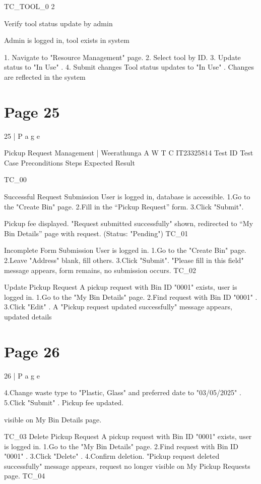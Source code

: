 \documentclass{article}
\begin{document}
TC\_TOOL\_0
2 
 
Verify tool 
status 
update by 
admin 
 
Admin is 
logged in, tool 
exists in 
system 
 
1. Navigate to 
"Resource 
Management" page. 
2. Select tool by ID. 
3. Update status to 
"In Use" . 4. Submit 
changes 
Tool status updates 
to "In Use" . 
Changes are 
reflected in the 
system 
 
 

\section*{Page 25}
25 | P a g e 
 
 
 
 
 
 
Pickup Request Management | Weerathunga A W T C 
IT23325814 
Test ID Test Case Preconditions Steps Expected 
Result 
     
TC\_00 
 
Successful 
Request 
Submission 
User is logged 
in, database is 
accessible. 
1.Go to the 
"Create Bin" 
page. 
2.Fill in the 
“Pickup 
Request” form. 
3.Click 
"Submit". 
 
Pickup fee 
displayed. 
"Request 
submitted 
successfully" 
shown, 
redirected to 
“My Bin 
Details” page 
with request. 
(Status: 
"Pending") 
TC\_01 
 
Incomplete 
Form 
Submission 
User is logged 
in. 
1.Go to the 
"Create Bin" 
page. 
2.Leave 
"Address" 
blank, fill 
others. 
3.Click 
"Submit". 
"Please fill in 
this field" 
message 
appears, form 
remains, no 
submission 
occurs. 
TC\_02 
 
Update Pickup 
Request 
A pickup 
request with 
Bin ID "0001" 
exists, user is 
logged in. 
1.Go to the "My 
Bin Details" 
page. 
2.Find request 
with Bin ID 
"0001" . 
3.Click "Edit" . 
A "Pickup 
request 
updated 
successfully" 
message 
appears, 
updated details 

\section*{Page 26}
26 | P a g e 
 
4.Change waste 
type to "Plastic, 
Glass" and 
preferred date 
to 
"03/05/2025" . 
5.Click 
"Submit" . 
Pickup fee 
updated. 
 
visible on My 
Bin Details 
page. 
 
TC\_03 Delete Pickup 
Request 
A pickup 
request with 
Bin ID "0001" 
exists, user is 
logged in. 
1.Go to the "My 
Bin Details" 
page. 
2.Find request 
with Bin ID 
"0001" . 
3.Click 
"Delete" . 
4.Confirm 
deletion. 
"Pickup request 
deleted 
successfully" 
message 
appears, 
request no 
longer visible 
on My Pickup 
Requests page. 
TC\_04 
 
\end{document}
